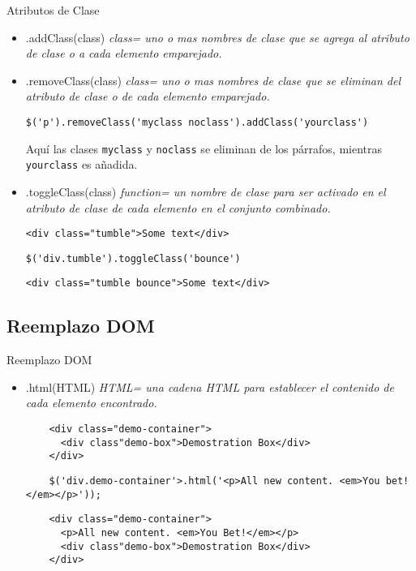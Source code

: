 \begin{frame}[fragile]{Atributos de Clase} %
\begin{itemize}
    \item .addClass(class) \textit{ class= uno o mas nombres de clase que se agrega al atributo de clase o a cada elemento emparejado.}
    \item .removeClass(class) \textit{ class= uno o mas nombres de clase que se eliminan del atributo de clase o de cada elemento emparejado.}
\begin{lstlisting}
$('p').removeClass('myclass noclass').addClass('yourclass')
\end{lstlisting}
Aquí las clases \texttt{myclass} y \texttt{noclass} se eliminan de los
párrafos, mientras \texttt{yourclass} es añadida.
    \item .toggleClass(class) \textit{ function= un nombre de clase para ser activado en el atributo de clase de cada elemento en el conjunto combinado.}
\begin{lstlisting}
<div class="tumble">Some text</div>
\end{lstlisting}
\begin{lstlisting}
$('div.tumble').toggleClass('bounce')
\end{lstlisting}
\begin{lstlisting}
<div class="tumble bounce">Some text</div>
\end{lstlisting}
\end{itemize}
\end{frame}

\subsection{Reemplazo DOM} %

\begin{frame}[fragile]{Reemplazo DOM} %
\begin{itemize}
    \item .html(HTML) \textit{ HTML= una cadena HTML para establecer el contenido de cada elemento encontrado.} 
    \begin{lstlisting}
    <div class="demo-container">
      <div class"demo-box">Demostration Box</div>
    </div>
    \end{lstlisting}
    \begin{lstlisting}
    $('div.demo-container'>.html('<p>All new content. <em>You bet!</em></p>'));
    \end{lstlisting}
    \begin{lstlisting}
    <div class="demo-container">
      <p>All new content. <em>You Bet!</em></p>
      <div class"demo-box">Demostration Box</div>
    </div>
    \end{lstlisting}
\end{itemize}
\end{frame}

